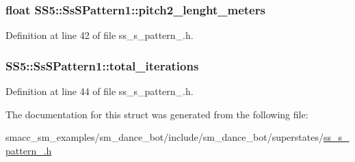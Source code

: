 \subsubsection[{\texorpdfstring{pitch2\+\_\+lenght\+\_\+meters}{pitch2_lenght_meters}}]{\setlength{\rightskip}{0pt plus 5cm}float S\+S5\+::\+Ss\+S\+Pattern1\+::pitch2\+\_\+lenght\+\_\+meters}\hypertarget{structSS5_1_1SsSPattern1_ab0b8056ab43a1a3a4c923ea543e783a2}{}\label{structSS5_1_1SsSPattern1_ab0b8056ab43a1a3a4c923ea543e783a2}


Definition at line 42 of file ss\+\_\+s\+\_\+pattern\+\_.\+h.

\subsubsection[{\texorpdfstring{total\+\_\+iterations}{total_iterations}}]{ S\+S5\+::\+Ss\+S\+Pattern1\+::total\+\_\+iterations}\hypertarget{structSS5_1_1SsSPattern1_a76a0ea3cb4b7cc9486114e3d461fcf2b}{}\label{structSS5_1_1SsSPattern1_a76a0ea3cb4b7cc9486114e3d461fcf2b}


Definition at line 44 of file ss\+\_\+s\+\_\+pattern\+\_.\+h.



The documentation for this struct was generated from the following file\+:\begin{DoxyCompactItemize}
\item 
smacc\+\_\+sm\+\_\+examples/sm\+\_\+dance\+\_\+bot/include/sm\+\_\+dance\+\_\+bot/superstates/\hyperlink{ss__s__pattern__1_8h}{ss\+\_\+s\+\_\+pattern\+\_.\+h}\end{DoxyCompactItemize}
